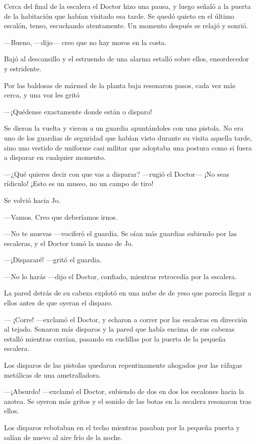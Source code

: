 Cerca del final de la escalera el Doctor hizo una pausa, y luego señaló
a la puerta de la habitación que habían visitado esa tarde. Se quedó
quieto en el último escalón, tenso, escuchando atentamente. Un momento
después se relajó y sonrió.

---Bueno, ---dijo--- creo que no hay moros en la costa.

Bajó al descansillo y el estruendo de una alarma estalló sobre ellos,
ensordecedor y estridente.

Por las baldosas de mármol de la planta baja resonaron pasos, cada vez
más cerca, y una voz les gritó

---¡Quédense exactamente donde están o disparo!

Se dieron la vuelta y vieron a un guardia apuntándoles con una pistola.
No era uno de los guardias de seguridad que habían visto durante su
visita aquella tarde, sino uno vestido de uniforme casi militar que
adoptaba una postura como si fuera a disparar en cualquier momento.

---¿Qué quieres decir con que vas a disparar? ---rugió el Doctor--- ¡No
seas rídiculo! ¡Esto es un museo, no un campo de tiro!

Se volvió hacia Jo.

---Vamos. Creo que deberíamos irnos.

---No te muevas ---vociferó el guardia. Se oían más guardias subiendo
por las escaleras, y el Doctor tomó la mano de Jo.

---¡Dispararé! ---gritó el guardia.

---No lo harás ---dijo el Doctor, confiado, mientras retrocedía por la
escalera.

La pared detrás de su cabeza explotó en una nube de de yeso que parecía
llegar a ellos antes de que oyeran el disparo.

--- ¡Corre! ---exclamó el Doctor, y echaron a correr por las escaleras
en dirección al tejado. Sonaron más disparos y la pared que había encima
de sus cabezas estalló mientras corrían, pasando en cuclillas por la
puerta de la pequeña escalera.

Los disparos de las pistolas quedaron repentinamente ahogados por las
ráfagas metálicas de una ametralladora.

---¡Absurdo! ---exclamó el Doctor, subiendo de dos en dos los escalones
hacia la azotea. Se oyeron más gritos y el sonido de las botas en la
escalera resonaron tras ellos.

Los disparos rebotaban en el techo mientras pasaban por la pequeña
puerta y salían de nuevo al aire frío de la noche.

